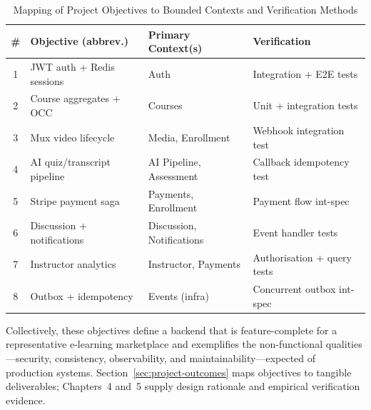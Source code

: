 \begin{table}[H]
  \centering
  \caption{Mapping of Project Objectives to Bounded Contexts and Verification Methods}
  \label{tab:objectives-mapping}
  \small
  \begin{tabular}{@{}clp{3.8cm}p{3.5cm}@{}}
    \toprule
    \textbf{\#} & \textbf{Objective (abbrev.)} & \textbf{Primary Context(s)} & \textbf{Verification} \\
    \midrule
    1 & JWT auth + Redis sessions & Auth & Integration + E2E tests \\
    2 & Course aggregates + OCC & Courses & Unit + integration tests \\
    3 & Mux video lifecycle & Media, Enrollment & Webhook integration test \\
    4 & AI quiz/transcript pipeline & AI Pipeline, Assessment & Callback idempotency test \\
    5 & Stripe payment saga & Payments, Enrollment & Payment flow int-spec \\
    6 & Discussion + notifications & Discussion, Notifications & Event handler tests \\
    7 & Instructor analytics & Instructor, Payments & Authorisation + query tests \\
    8 & Outbox + idempotency & Events (infra) & Concurrent outbox int-spec \\
    \bottomrule
  \end{tabular}
\end{table}

Collectively, these objectives define a backend that is feature-complete for a representative e-learning marketplace and exemplifies the non-functional qualities---security, consistency, observability, and maintainability---expected of production systems. Section~\ref{sec:project-outcomes} maps objectives to tangible deliverables; Chapters~4 and~5 supply design rationale and empirical verification evidence.
